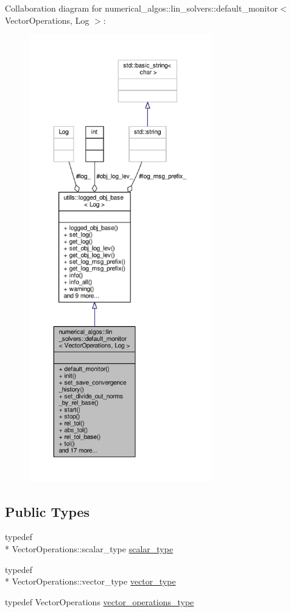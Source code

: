 Collaboration diagram for numerical\-\_\-algos\-:\-:lin\-\_\-solvers\-:\-:default\-\_\-monitor$<$ Vector\-Operations, Log $>$\-:\nopagebreak
\begin{figure}[H]
\begin{center}
\leavevmode
\includegraphics[height=550pt]{classnumerical__algos_1_1lin__solvers_1_1default__monitor__coll__graph}
\end{center}
\end{figure}
\subsection*{Public Types}
\begin{DoxyCompactItemize}
\item 
typedef \\*
Vector\-Operations\-::scalar\-\_\-type \hyperlink{classnumerical__algos_1_1lin__solvers_1_1default__monitor_a9c025ecb40da565f0f1584cbf2b10999}{scalar\-\_\-type}
\item 
typedef \\*
Vector\-Operations\-::vector\-\_\-type \hyperlink{classnumerical__algos_1_1lin__solvers_1_1default__monitor_afe4ad299b536cf5df8efbd2c08b619f5}{vector\-\_\-type}
\item 
typedef Vector\-Operations \hyperlink{classnumerical__algos_1_1lin__solvers_1_1default__monitor_a1353cb66ac3391ffaba236b3a860dc8e}{vector\-\_\-operations\-\_\-type}
\end{DoxyCompactItemize}

